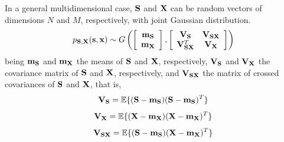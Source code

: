 {In a general multidimensional case, ${\bf S}$ and ${\bf X}$ can be random vectors of dimensions $N$ and $M$, respectively, with joint Gaussian distribution.
\begin{equation}
p_{{\bf S},{\bf X}}({\bf s},{\bf x}) 
   \sim G\left(\left[\begin{array}{c} {\bf m_S} \\ {\bf m_X} \end{array}\right],
               \left[\begin{array}{cc} {\bf V_S}          & {\bf V_{SX}}   \\ 
                                       {\bf V}_{\bf SX}^T & {\bf V_{X}}   
                     \end{array}\right]\right)
\end{equation}
being ${\bf m_S}$ and ${\bf m_X}$ the means of $ {\bf S}$ and $ {\bf X}$, respectively, ${\bf V_S}$ and ${\bf V_X}$ the covariance matrix of ${\bf S}$ and  ${\bf X}$, respectively, and ${\bf V_{SX}}$ the matrix of crossed covariances of ${\bf S}$ and ${\bf X}$, that is,
\begin{equation}
{\bf V_S} = \mathbb{E}\{({\bf S}-{\bf m_S})({\bf S}-{\bf m_S})^T\} \\
\end{equation}
\begin{equation}
{\bf V_X} = \mathbb{E}\{({\bf X}-{\bf m_X})({\bf X}-{\bf m_X})^T\}
\end{equation}
\begin{equation}
{\bf V_{SX}} = \mathbb{E}\{({\bf S}-{\bf m_S})({\bf X}-{\bf m_X})^T\}
\end{equation}
}
